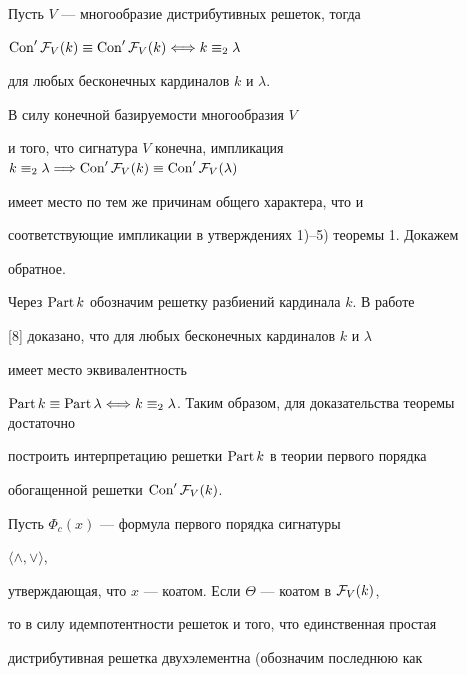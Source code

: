 \begin{thm}


Пусть $V$ --- многообразие дистрибутивных решеток, тогда


$\Con '{\cal F}_V(k)\equiv \Con '{\cal F}_V(k)\Longleftrightarrow


k\equiv_2\lambda$


для любых бесконечных кардиналов $k$ и $\lambda$.


\end{thm}





\begin{pf}


В силу конечной базируемости многообразия $V$


и того, что сигнатура $V$ конечна, импликация $k\equiv_2\lambda


\Longrightarrow \Con '{\cal F}_V(k)\equiv \Con '{\cal F}_V(\lambda)$


имеет место по тем же причинам общего характера, что и 


соответствующие импликации в утверждениях 1)--5) теоремы 1. Докажем


обратное.





Через $\operatorname{Part} k$ обозначим решетку разбиений кардинала $k$. В работе


[8] доказано, что для любых бесконечных кардиналов $k$ и $\lambda$


имеет место эквивалентность


$\Part k\equiv \Part\lambda\Longleftrightarrow\linebreak


k\equiv_2\lambda$. Таким образом, для доказательства теоремы достаточно


построить интерпретацию решетки $\operatorname{Part} k$ в теории первого порядка


обогащенной решетки $\operatorname{Con} '{\cal F}_V(k)$.





Пусть $\Phi_c(x)$ --- формула первого порядка сигнатуры


$\langle\wedge,\vee\rangle$,


утверждающая, что $x$ --- коатом. Если $\Theta$ --- коатом в ${\cal F}_V(k)$,


то в силу идемпотентности решеток и того, что единственная простая


дистрибутивная решетка двухэлементна (обозначим последнюю как



\end{pf}
